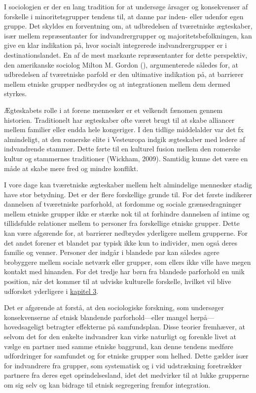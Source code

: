 \documentclass[
]{book}
\begin{document}
I sociologien er der en lang tradition for at undersøge årsager og konsekvenser af forskelle i minoritetsgrupper tendens til, at danne par inden- eller udenfor egen gruppe. Det skyldes en forventning om, at udbredelsen af tværetniske ægteskaber, især mellem repræsentanter for indvandrergrupper og majoritetsbefolkningen, kan give en klar indikation på, hvor socialt integrerede indvandrergrupper er i destinationslandet. En af de mest markante repræsentanter for dette perspektiv, den amerikanske sociolog Milton M. Gordon (), argumenterede således for, at udbredelsen af tværetniske parfold er den ultimative indikation på, at barrierer mellem etniske grupper nedbrydes og at integrationen mellem dem dermed styrkes.

Ægteskabets rolle i at forene mennesker er et velkendt fænomen gennem historien. Traditionelt har ægteskaber ofte været brugt til at skabe alliancer mellem familier eller endda hele kongeriger. I den tidlige middelalder var det fx almindeligt, at den romerske elite i Vesteuropa indgik ægteskaber med ledere af indvandrende stammer. Dette førte til en kulturel fusion mellem den romerske kultur og stammernes traditioner (Wickham, 2009). Samtidig kunne det være en måde at skabe mere fred og mindre konflikt.

I vore dage kan tværetniske ægteskaber mellem helt almindelige mennesker stadig have stor betydning. Det er der flere forskellige grunde til. For det første indikerer dannelsen af tværetniske parforhold, at fordomme og sociale grænsedragninger mellem etniske grupper ikke er stærke nok til at forhindre dannelsen af intime og tillidsfulde relationer mellem to personer fra forskellige etniske grupper. Dette kan være afgørende for, at barrierer nedbrydes yderligere mellem grupperne. For det andet forener et blandet par typisk ikke kun to individer, men også deres familie og venner. Personer der indgår i blandede par kan således agere brobyggere mellem sociale netværk eller grupper, som ellers ikke ville have megen kontakt med hinanden. For det tredje har børn fra blandede parforhold en unik position, når det kommer til at udviske kulturelle forskelle, hvilket vil blive udforsket yderligere i \hyperref[kap3]{kapitel 3}.

Det er afgørende at forstå, at den sociologiske forskning, som undersøger konsekvenserne af etnisk blandende parforhold---eller mangel herpå---hovedsageligt betragter effekterne på samfundsplan. Disse teorier fremhæver, at selvom det for den enkelte indvandrer kan virke naturligt og forenkle livet at vælge en partner med samme etniske baggrund, kan denne tendens medføre udfordringer for samfundet og for etniske grupper som helhed. Dette gælder især for indvandrere fra grupper, som systematisk og i vid udstrækning foretrækker partnere fra deres eget oprindelsesland, idet det medvirker til at lukke grupperne om sig selv og kan bidrage til etnisk segregering fremfor integration.
\end{document}
